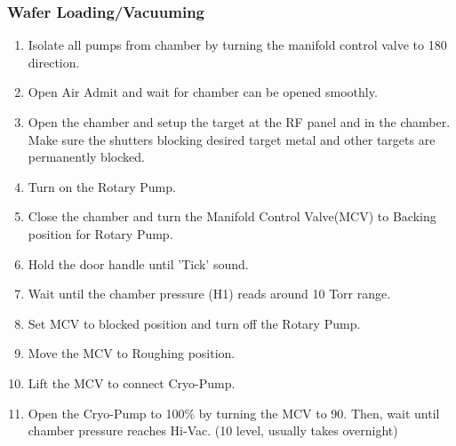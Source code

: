 \subsubsection{Wafer Loading/Vacuuming}
\label{Edwards:Loading}
\begin{enumerate}
\item Isolate all pumps from chamber by turning the manifold control valve to 180 direction.
\item Open Air Admit and wait for chamber can be opened smoothly.
\item Open the chamber and setup the target at the RF panel and in the chamber. Make sure the shutters blocking desired target metal and other targets are permanently blocked.
\item Turn on the Rotary Pump.
\item Close the chamber and turn the Manifold Control Valve(MCV) to Backing position for Rotary Pump.
\item Hold the door handle until 'Tick' sound.
\item Wait until the chamber pressure (H1) reads around 10 Torr range.
\item Set MCV to blocked position and turn off the Rotary Pump.
\item Move the MCV to Roughing position.
\item Lift the MCV to connect Cryo-Pump.
\item Open the Cryo-Pump to 100\% by turning the MCV to 90. Then, wait until chamber pressure reaches Hi-Vac. (10 level, usually takes overnight)
\end{enumerate}

